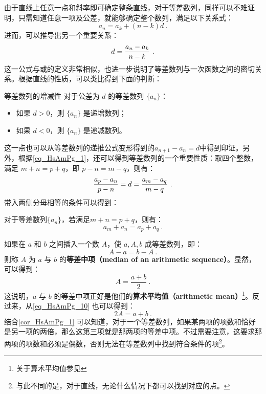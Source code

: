 由于直线上任意一点和斜率即可确定整条直线，对于等差数列，同样可以不难证明，只需知道任意一项及公差，就能够确定整个数列，满足以下关系式：
\begin{equation}
a_n=a_k+(n-k)d~.
\end{equation}
进而，可以推导出另一个重要关系：
\begin{equation}\label{eq_HsAmPg_1}
d={a_n-a_k\over n-k}~.
\end{equation}
这一公式与或的定义非常相似，也进一步说明了等差数列与一次函数之间的密切关系。根据直线的性质，可以类比得到下面的判断：

\begin{corollary}{等差数列的增减性}\label{cor_HsAmPg_2}
对于公差为 $d$ 的等差数列 $\{a_n\}$：
\begin{itemize}
\item 如果 $d > 0$，则 $\{a_n\}$ 是递增数列；
\item 如果 $d < 0$，则 $\{a_n\}$ 是递减数列。
\end{itemize}
\end{corollary}

这一点也可以从等差数列的递推公式变形得到的$a_{n+1}-a_n=d$中得到印证。另外，根据\autoref{eq_HsAmPg_1}，还可以得到等差数列的一个重要性质：取四个整数，满足 $m+n=p+q$，即 $p-n=m-q$，则有：
\begin{equation}
{a_p-a_n\over p-n}=d={a_m-a_q\over m-q}~.
\end{equation}
带入两侧分母相等的条件可以得到：
\begin{corollary}{}\label{cor_HsAmPg_1}
对于等差数列$\{a_n\}$，若满足$m+n=p+q$，则有：
\begin{equation}
a_m+a_n=a_p+a_q~.
\end{equation}
\end{corollary}

如果在 $a$ 和 $b$ 之间插入一个数 $A$，使 $a, A, b$ 成等差数列，即：
\begin{equation}\label{eq_HsAmPg_10}
A - a = b - A~.
\end{equation}
则称 $A$ 为 $a$ 与 $b$ 的\textbf{等差中项（median of an arithmetic sequence）}。显然，可以得到：
\begin{equation}
A = \frac{a+b}{2}~.
\end{equation}
这说明，$a$ 与 $b$ 的等差中项正好是他们的\textbf{算术平均值（arithmetic mean）}\footnote{关于算术平均值参见}。反过来，从\autoref{eq_HsAmPg_10} 也可以得到：
\begin{equation}
2A = a+b~.
\end{equation}
结合\autoref{cor_HsAmPg_1} 可以知道，对于一个等差数列，如果某两项的项数和恰好是另一项的两倍，那么这第三项就是那两项的等差中项。不过需要注意，这要求那两项的项数和必须是偶数，否则无法在等差数列中找到符合条件的项\footnote{与此不同的是，对于直线，无论什么情况下都可以找到对应的点。}。

